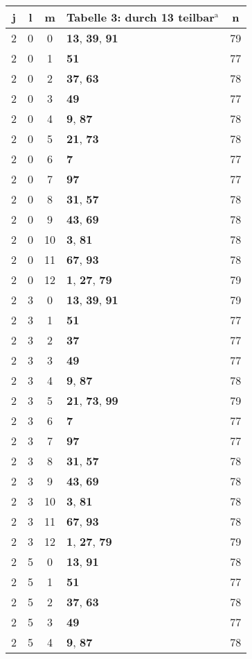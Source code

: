 \documentclass{article}
\begin{document}
\begin{minipage}[t]{0.5\textwidth}
\vspace{0pt}
\begin{flushleft}
\begin{tabular}{||c|c|c|l|c||}
	j&l&m&Tabelle 3: durch 13 teilbar$^{\mathrm{a}}$&n\\
	\hline
	2&0&0&\textbf{13}, \textbf{39}, \textbf{91}&79\\
	2&0&1&\textbf{51}&77\\
	2&0&2&\textbf{37}, \textbf{63}&78\\
	2&0&3&\textbf{49}&77\\
	2&0&4&\textbf{9}, \textbf{87}&78\\
	2&0&5&\textbf{21}, \textbf{73}&78\\
	2&0&6&\textbf{7}&77\\
	2&0&7&\textbf{97}&77\\
	2&0&8&\textbf{31}, \textbf{57}&78\\
	2&0&9&\textbf{43}, \textbf{69}&78\\
	2&0&10&\textbf{3}, \textbf{81}&78\\
	2&0&11&\textbf{67}, \textbf{93}&78\\
	2&0&12&\textbf{1}, \textbf{27}, \textbf{79}&79\\
	2&3&0&\textbf{13}, \textbf{39}, \textbf{91}&79\\
	2&3&1&\textbf{51}&77\\
	2&3&2&\textbf{37}&77\\
	2&3&3&\textbf{49}&77\\
	2&3&4&\textbf{9}, \textbf{87}&78\\
	2&3&5&\textbf{21}, \textbf{73}, \textbf{99}&79\\
	2&3&6&\textbf{7}&77\\
	2&3&7&\textbf{97}&77\\
	2&3&8&\textbf{31}, \textbf{57}&78\\
	2&3&9&\textbf{43}, \textbf{69}&78\\
	2&3&10&\textbf{3}, \textbf{81}&78\\
	2&3&11&\textbf{67}, \textbf{93}&78\\
	2&3&12&\textbf{1}, \textbf{27}, \textbf{79}&79\\
	2&5&0&\textbf{13}, \textbf{91}&78\\
	2&5&1&\textbf{51}&77\\
	2&5&2&\textbf{37}, \textbf{63}&78\\
	2&5&3&\textbf{49}&77\\
	2&5&4&\textbf{9}, \textbf{87}&78\\

\end{tabular}
\end{flushleft}
\end{minipage}
\end{document}

